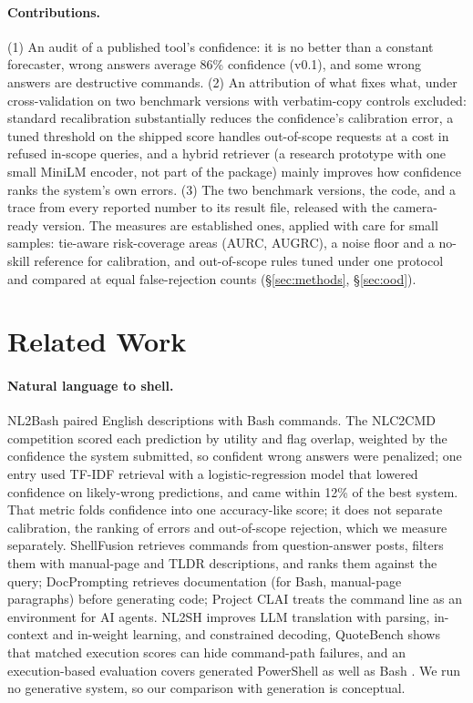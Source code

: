 \paragraph{Contributions.} (1) An audit of a published tool's confidence: it is no better than a constant
forecaster, wrong answers average 86\% confidence (v0.1), and some wrong answers are destructive commands. (2) An
attribution of what fixes what, under cross-validation on two benchmark versions with verbatim-copy controls
excluded: standard recalibration substantially reduces the confidence's calibration error, a tuned threshold on the shipped score handles
out-of-scope requests at a cost in refused in-scope queries, and a hybrid retriever (a research prototype with one small
MiniLM encoder, not part of the package) mainly improves how confidence ranks the system's own errors. (3) The two
benchmark versions, the code, and a trace from every reported number to its result file, released with the
camera-ready version. The measures are established ones, applied with care for small samples: tie-aware
risk-coverage areas (AURC, AUGRC), a noise floor and a no-skill reference for calibration, and out-of-scope rules
tuned under one protocol and compared at equal false-rejection counts (\S\ref{sec:methods}, \S\ref{sec:ood}).

\section{Related Work}

\paragraph{Natural language to shell.} NL2Bash \citep{lin-etal-2018-nl2bash} paired English descriptions with
Bash commands. The NLC2CMD competition \citep{agarwal2021nlc2cmd} scored each prediction by utility and flag
overlap, weighted by the confidence the system submitted, so confident wrong answers were penalized; one
entry used TF-IDF retrieval with a logistic-regression model that lowered confidence on likely-wrong
predictions, and came within 12\% of the best system. That metric folds confidence into one accuracy-like score;
it does not separate calibration, the ranking of errors and out-of-scope rejection, which we measure
separately. ShellFusion \citep{zhang2022shellfusion} retrieves
commands from question-answer posts, filters them with manual-page and TLDR descriptions, and ranks them
against the query; DocPrompting \citep{zhou2023docprompting} retrieves documentation (for Bash, manual-page
paragraphs) before generating code; Project
CLAI \citep{agarwal2020clai} treats the command line as an environment for AI agents. NL2SH
\citep{westenfelder2025nl2sh} improves LLM translation with parsing, in-context and in-weight learning, and
constrained decoding, QuoteBench
\citep{li2026quotebench} shows that matched execution scores can hide command-path failures, and an
execution-based evaluation covers generated PowerShell as well as Bash \citep{vo2024execution}. We run no
generative system, so our comparison with generation is conceptual.

